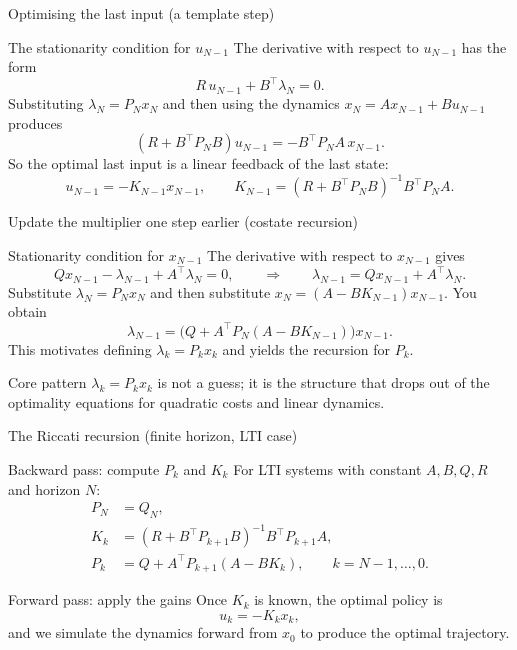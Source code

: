 \documentclass[aspectratio=169,11pt]{beamer}
\begin{document}
\begin{frame}{Optimising the last input (a template step)}
\begin{block}{The stationarity condition for $u_{N-1}$}
The derivative with respect to $u_{N-1}$ has the form
\[
R\,u_{N-1} + B^\top\lambda_N = 0.
\]
Substituting $\lambda_N = P_N x_N$ and then using the dynamics $x_N = Ax_{N-1}+Bu_{N-1}$ produces
\[
(R + B^\top P_N B)u_{N-1} = -B^\top P_N A\,x_{N-1}.
\]
So the optimal last input is a linear feedback of the last state:
\[
u_{N-1} = -K_{N-1}x_{N-1},\qquad K_{N-1}=(R+B^\top P_N B)^{-1}B^\top P_N A.
\]
\end{block}
\end{frame}

\begin{frame}{Update the multiplier one step earlier (costate recursion)}
\begin{block}{Stationarity condition for $x_{N-1}$}
The derivative with respect to $x_{N-1}$ gives
\[
Qx_{N-1} - \lambda_{N-1} + A^\top \lambda_N = 0,
\qquad\Rightarrow\qquad
\lambda_{N-1} = Qx_{N-1} + A^\top\lambda_N.
\]
Substitute $\lambda_N=P_N x_N$ and then substitute $x_N=(A-BK_{N-1})x_{N-1}$.
You obtain
\[
\lambda_{N-1} = \bigl(Q + A^\top P_N(A-BK_{N-1})\bigr)x_{N-1}.
\]
This motivates defining $\lambda_{k}=P_k x_k$ and yields the recursion for $P_k$.
\end{block}

\begin{alertblock}{Core pattern}
\(\lambda_{k}=P_kx_k\) is not a guess; it is the structure that drops out of the optimality equations for quadratic costs and linear dynamics.
\end{alertblock}
\end{frame}

\begin{frame}{The Riccati recursion (finite horizon, LTI case)}
\begin{block}{Backward pass: compute $P_k$ and $K_k$}
For LTI systems with constant $A,B,Q,R$ and horizon $N$:
\begin{align*}
P_N &= Q_N,\\
K_k &= (R + B^\top P_{k+1}B)^{-1}B^\top P_{k+1}A,\\
P_k &= Q + A^\top P_{k+1}(A - BK_k),\qquad k=N-1,\dots,0.
\end{align*}
\end{block}

\begin{block}{Forward pass: apply the gains}
Once $K_k$ is known, the optimal policy is
\[
u_k = -K_k x_k,
\]
and we simulate the dynamics forward from $x_0$ to produce the optimal trajectory.
\end{block}
\end{frame}
\end{document}
